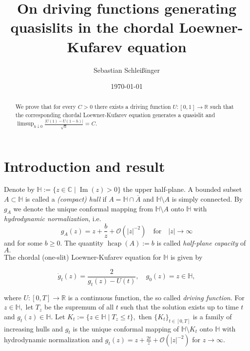\documentclass[11pt]{amsart}
\numberwithin{equation}{section}
\theoremstyle{plain}
\theoremstyle{definition}
\begin{document}
\parindent 0pt 
\setcounter{section}{0}

\author{Sebastian Schlei\ss inger}
\title[On driving functions for quasislits]{On driving functions generating quasislits in the chordal Loewner-Kufarev equation}
\date{\today}

\begin{abstract}
     We prove that for every $C>0$ there exists a driving function $U:[0,1]\to{\mathbb R}$ such that the corresponding chordal Loewner-Kufarev equation generates a quasislit and $ \limsup_{h\downarrow0}\frac{|U(1)-U(1-h)|}{\sqrt{h}}=C. $ 
\end{abstract}
\maketitle

\section{Introduction and result}

Denote by ${\mathbb H}:=\{z\in{\mathbb C}\;|\;{\operatorname{Im}}(z)>0\}$ the upper half-plane. A bounded subset $A\subset{\mathbb H}$ is called a \emph{(compact) hull} if $A={\mathbb H}\cap \overline{A}$ and ${\mathbb H}\setminus A$ is simply connected. By $g_A$ we denote the unique conformal
 mapping from ${\mathbb H}\setminus A$ onto ${\mathbb H}$ with \emph{hydrodynamic
   normalization}, i.e. $$g_A(z)=z+\frac{b}{z}+{\mathcal{O}}(|z|^{-2}) \quad
 \text{for} \quad |z|\to\infty$$ and for some $b\geq0$. The quantity ${\operatorname{hcap}}(A):=b$ is called
 \emph{half-plane capacity} of $A.$\\

 The chordal (one-slit) Loewner-Kufarev equation for ${\mathbb H}$ is given by

\begin{equation}\label{ivp}
   \dot{g}_t(z)=\frac{2}{g_t(z)-U(t)}, \quad g_0(z)=z\in{\mathbb H},
\end{equation}

where $U:[0,T]\to{\mathbb R}$ is a continuous function, the so called \emph{driving function}. For $z\in{\mathbb H},$ let $T_z$ be the supremum of all $t$ such that the solution exists up to time $t$ and $g_t(z)\in {\mathbb H}.$ Let $K_t:=\{z\in {\mathbb H} \; | \;  T_z\leq t\},$ then  $\{K_t\}_{t\in[0,T]}$ is a family of increasing hulls and $g_t$ is the unique conformal mapping of ${\mathbb H}\setminus K_t$ onto ${\mathbb H}$ with hydrodynamic normalization and $g_t(z)=z+\frac{2t}{z}+{\mathcal{O}}(|z|^{-2})$ for $z\to\infty.$\\
\end{document}
